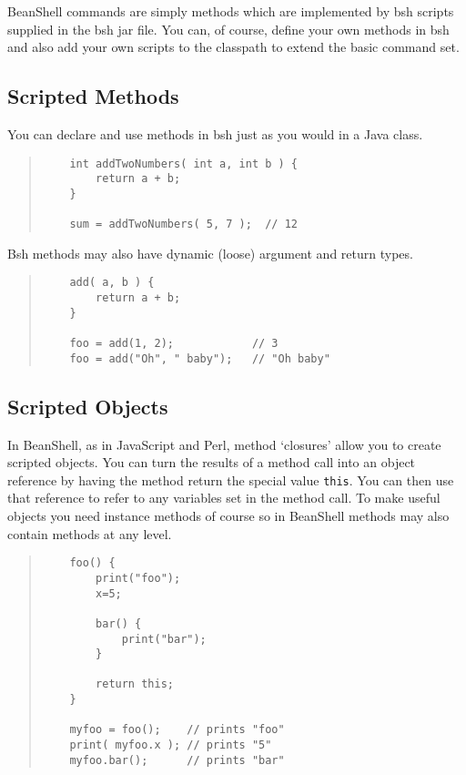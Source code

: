 \documentclass[twoside,11pt]{article}
\renewcommand{\_}{\texttt{\symbol{95}}}
\begin{document}
BeanShell commands are simply methods which are implemented by bsh scripts
supplied in the bsh jar file.  You can, of course, define your own methods
in bsh and also add your own scripts to the classpath to extend the basic
command set.

\subsection{Scripted Methods}

You can declare and use methods in bsh just as you would in a Java class.
\begin{quote}
\begin{verbatim}
    int addTwoNumbers( int a, int b ) {
        return a + b;
    }

    sum = addTwoNumbers( 5, 7 );  // 12
\end{verbatim}
\end{quote}
Bsh methods may also have dynamic (loose) argument and return types.
\begin{quote}
\begin{verbatim}
    add( a, b ) {
        return a + b;
    }

    foo = add(1, 2);            // 3
    foo = add("Oh", " baby");   // "Oh baby"
\end{verbatim}
\end{quote}

\subsection{Scripted Objects}

In BeanShell, as in JavaScript and Perl, method `closures' allow you
to create scripted objects.  You can turn the results of a method call
into an object reference by having the method return the special value
\texttt{this}.  You can then use that reference to refer to
any variables set in the method call.  To make useful objects you need
instance methods of course so in BeanShell methods may also contain
methods at any level.
\begin{quote}
\begin{verbatim}
    foo() {
        print("foo");
        x=5;

        bar() {
            print("bar");
        }

        return this;
    }

    myfoo = foo();    // prints "foo"
    print( myfoo.x ); // prints "5"
    myfoo.bar();      // prints "bar"
\end{verbatim}
\end{quote}
\end{document}
